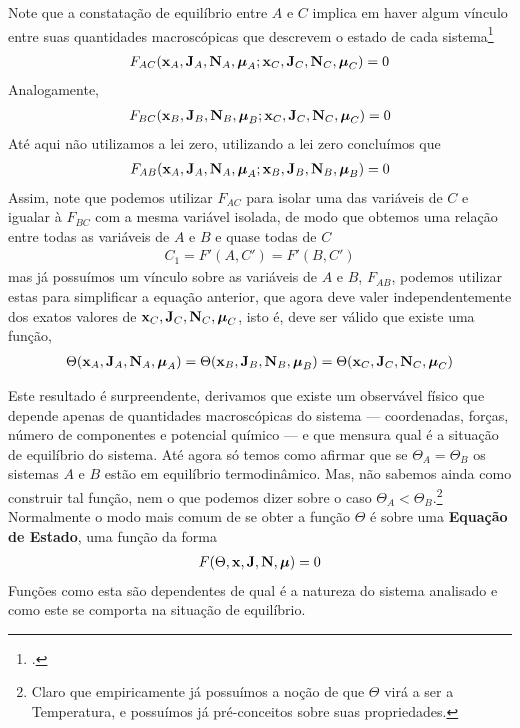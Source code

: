 \documentclass[twoside]{amsart}
\numberwithin{equation}{section}
\begin{document}
\begin{refsection}
Note que a constatação de equilíbrio entre $A$ e $C$ implica em haver algum vínculo entre suas 
quantidades macroscópicas que descrevem o estado de cada sistema\footcite{kardar} 
\begin{align}F_{AC}\qty(\vb{x}_A,\vb{J}_A,\vb{N}_A,\boldsymbol{\mu}_A;\vb{x}_C,\vb{J}_C,\vb{N}_C,\boldsymbol{\mu}_C)=0\end{align} Analogamente, 
\begin{align}F_{BC}\qty(\vb{x}_B,\vb{J}_B,\vb{N}_B,\boldsymbol{\mu}_B;\vb{x}_C,\vb{J}_C,\vb{N}_C,\boldsymbol{\mu}_C)=0\end{align} Até aqui não utilizamos a 
lei zero, utilizando a lei zero concluímos que \begin{align}F_{AB}\qty(\vb{x}_A,\vb{J}_A,\vb{N}_A,\boldsymbol{\mu}_A;\vb{x}_B,\vb{J}_B,\vb{N}_B,\boldsymbol{\mu}_B)=0\end{align} Assim, note que podemos utilizar $F_{AC}$ para isolar uma das 
variáveis de $C$ e igualar à $F_{BC}$ com a mesma variável isolada, de modo que obtemos uma relação entre todas as 
variáveis de $A$ e $B$ e quase todas de $C$ \begin{align}C_1=F'(A,C')=F'(B,C')\end{align} mas já possuímos um vínculo sobre as variáveis de 
$A$ e $B$, $F_{AB}$, podemos utilizar estas para simplificar a equação anterior, que agora deve valer independentemente dos exatos valores de $\vb{x}_C,\vb{J}_C,\vb{N}_C,\boldsymbol{\mu}_C$, isto é, deve ser válido que existe uma função, \begin{align}\Theta(\vb{x}_A,\vb{J}_A,\vb{N}_A,\boldsymbol{\mu}_A)=\Theta(\vb{x}_B,\vb{J}_B,\vb{N}_B,\boldsymbol{\mu}_B)=\Theta(\vb{x}_C,\vb{J}_C,\vb{N}_C,\boldsymbol{\mu}_C)\end{align}

Este resultado é surpreendente, derivamos que existe um observável físico que depende apenas de 
quantidades macroscópicas do sistema --- coordenadas, forças, número de componentes e potencial químico --- e que mensura qual é a situação de equilíbrio do sistema. Até agora só temos como 
afirmar que se $\Theta_A=\Theta_B$ os sistemas $A$ e $B$ estão em equilíbrio termodinâmico. Mas, 
não sabemos ainda como construir tal função, nem o que podemos dizer sobre o caso $\Theta_A<\Theta_B$.\footnote{Claro que empiricamente já possuímos a noção de que $\Theta$ virá a ser a Temperatura, e possuímos já pré-conceitos sobre suas propriedades.} Normalmente o modo 
mais comum de se obter a função $\Theta$ é sobre uma \textbf{Equação de Estado}, uma função da 
forma \begin{align}F\qty(\Theta,\vb{x},\vb{J},\vb{N},\boldsymbol{\mu})=0\end{align} Funções como 
esta são dependentes de qual é a natureza do sistema analisado e como este se comporta na
situação de equilíbrio.


\end{refsection}
\end{document}
